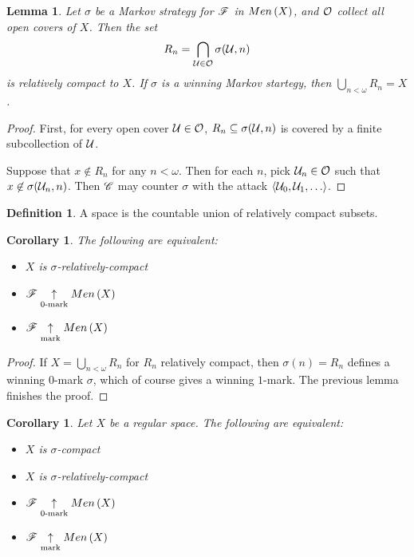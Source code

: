 \documentclass{amsart}
\newtheorem{lemma}[theorem]{Lemma}
\newtheorem{corollary}[theorem]{Corollary}
\theoremstyle{definition}
\newtheorem{definition}[theorem]{Definition}
\begin{document}
\begin{lemma}
  Let \(\sigma\) be a Markov strategy for \(\mathscr{F}\) in
  \(Men\left({X}\right)\), and \(\mathcal{O}\) collect all open covers of \(X\). Then the
  set
    \[
      R_n = \bigcap_{\mathcal{U}\in\mathcal{O}} \sigma(\mathcal{U},n)
    \]
  is relatively compact to \(X\). If \(\sigma\) is a winning
  Markov startegy, then \(\bigcup_{n<\omega} R_n = X\).
\end{lemma}

\begin{proof}
  First, for every open cover \(\mathcal{U}\in\mathcal{O}\),
  \(R_n\subseteq\sigma(\mathcal{U},n)\) is covered by a finite subcollection of \(\mathcal{U}\).

  Suppose that \(x \not\in R_n\) for any \(n<\omega\). Then for each \(n\),
  pick \(\mathcal{U}_n\in\mathcal{O}\) such that \(x\not\in \sigma(\mathcal{U}_n,n)\). Then
  \(\mathscr{C}\) may counter \(\sigma\) with the attack \(\<\mc U_0,\mc U_1,\dots\>\).
\end{proof}

\begin{definition}
  A  space is the countable union of
  relatively compact subsets.
\end{definition}

\begin{corollary}
  The following are equivalent:
  \begin{itemize}
    \item \(X\) is \(\sigma\)-relatively-compact
    \item \(\mathscr{F} \underset{0\text{-mark}}{\uparrow} Men\left({X}\right)\)
    \item \(\mathscr{F} \underset{\text{mark}}{\uparrow} Men\left({X}\right)\)
  \end{itemize}
\end{corollary}

\begin{proof}
  If \(X=\bigcup_{n<\omega} R_n\) for \(R_n\) relatively compact, then
  \(\sigma(n)=R_n\) defines a winning \(0\)-mark \(\sigma\),
  which of course gives a
  winning \(1\)-mark. The previous lemma finishes the proof.
\end{proof}

\begin{corollary}
  Let \(X\) be a regular space. The following are equivalent:
  \begin{itemize}
    \item \(X\) is \(\sigma\)-compact
    \item \(X\) is \(\sigma\)-relatively-compact
    \item \(\mathscr{F} \underset{0\text{-mark}}{\uparrow} Men\left({X}\right)\)
    \item \(\mathscr{F} \underset{\text{mark}}{\uparrow} Men\left({X}\right)\)
  \end{itemize}
\end{corollary}
\end{document}
